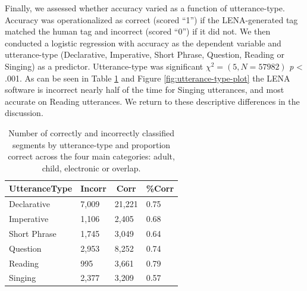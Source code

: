 \documentclass[man,floatsintext]{apa6}
\theoremstyle{definition}
\theoremstyle{definition}
\theoremstyle{definition}
\theoremstyle{remark}
\begin{document}
Finally, we assessed whether accuracy varied as a function of
utterance-type. Accuracy was operationalized as correct (scored
\enquote{1}) if the LENA-generated tag matched the human tag and
incorrect (scored \enquote{0}) if it did not. We then conducted a
logistic regression with accuracy as the dependent variable and
utterance-type (Declarative, Imperative, Short Phrase, Question, Reading
or Singing) as a predictor. Utterance-type was significant
\(\chi^2 = (5, N=57982)\) \emph{p} \textless{} .001. As can be seen in
Table \ref{tab:utterance-glm} and Figure \ref{fig:utterance-type-plot}
the LENA software is incorrect nearly half of the time for Singing
utterances, and most accurate on Reading utterances. We return to these
descriptive differences in the discussion.

\begin{table}[H]
\begin{center}
\begin{threeparttable}
\caption{\label{tab:utterance-glm}Number of correctly and incorrectly classified segments by utterance-type and proportion correct across the four main categories: adult, child, electronic or overlap.}
\begin{tabular}{llll}
\toprule
UtteranceType & \multicolumn{1}{c}{Incorr} & \multicolumn{1}{c}{Corr} & \multicolumn{1}{c}{\%Corr}\\
\midrule
Declarative & 7,009 & 21,221 & 0.75\\
Imperative & 1,106 & 2,405 & 0.68\\
Short Phrase & 1,745 & 3,049 & 0.64\\
Question & 2,953 & 8,252 & 0.74\\
Reading & 995 & 3,661 & 0.79\\
Singing & 2,377 & 3,209 & 0.57\\
\bottomrule
\end{tabular}
\end{threeparttable}
\end{center}
\end{table}
\end{document}
